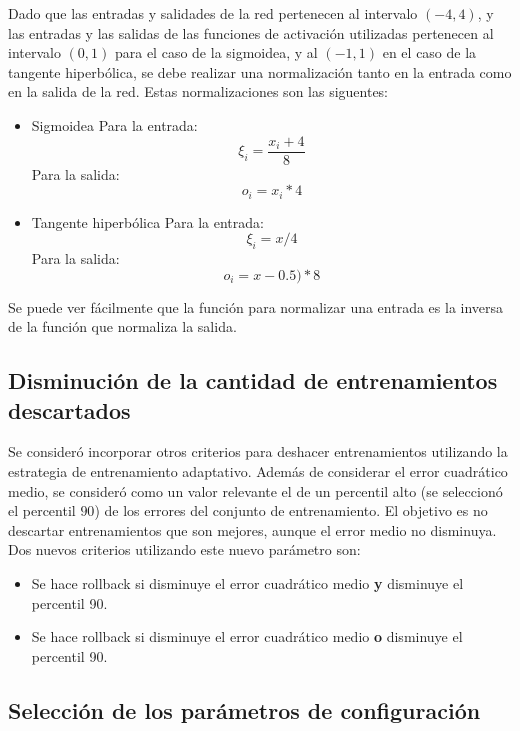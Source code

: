 \documentclass[a4paper,10pt]{article}
\begin{document}
        Dado que las entradas y salidades de la red pertenecen al intervalo $(-4, 4)$, y las entradas y las salidas de las funciones de activación utilizadas 
        pertenecen al intervalo $(0,1)$ para el caso de la sigmoidea, y al $(-1,1)$ en el caso de la tangente hiperbólica, se debe realizar una normalización 
        tanto en la entrada como en la salida de la red. Estas normalizaciones son las siguentes:

        \begin{itemize}
            \item Sigmoidea
                Para la entrada: \[ \xi_{i} = \frac{x_{i} + 4}{8} \]
                Para la salida: \[ o_{i} = x_{i} * 4 \]
            \item Tangente hiperbólica
                Para la entrada: \[ \xi_{i} = x / 4 \]
                Para la salida: \[ o_{i} = x - 0.5) * 8 \]
        \end{itemize}

        Se puede ver fácilmente que la función para normalizar una entrada es la inversa de la función que normaliza la salida.

    \subsection{Disminución de la cantidad de entrenamientos descartados}

        Se consideró incorporar otros criterios para deshacer entrenamientos utilizando la estrategia de entrenamiento adaptativo. Además de considerar el error cuadrático medio, 
        se consideró como un valor relevante el de un percentil alto (se seleccionó el percentil $90$) de los errores del conjunto de entrenamiento. El objetivo es no descartar 
        entrenamientos que son mejores, aunque el error medio no disminuya. Dos nuevos criterios utilizando este nuevo parámetro son:

        \begin{itemize}
            \item Se hace rollback si disminuye el error cuadrático medio \textbf{y} disminuye el percentil 90.
            \item Se hace rollback si disminuye el error cuadrático medio \textbf{o} disminuye el percentil 90.
        \end{itemize}

    \subsection{Selección de los parámetros de configuración}
\end{document}
